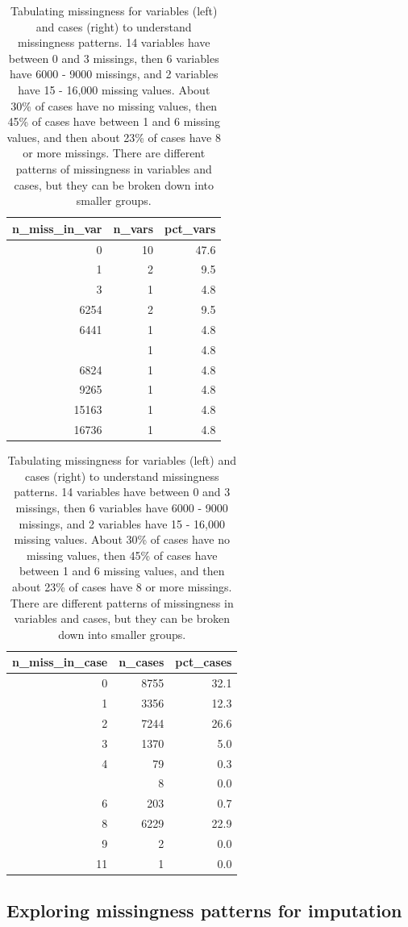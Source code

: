 \documentclass[]{article}
\theoremstyle{definition}
\theoremstyle{definition}
\theoremstyle{definition}
\theoremstyle{remark}
\begin{document}
\begin{table}[!h]
\caption{\label{tab:housing-miss-var-case-table}Tabulating missingness for variables (left) and cases (right) to understand missingness patterns. 14 variables have between 0 and 3 missings, then 6 variables have 6000 - 9000 missings, and 2 variables have 15 - 16,000 missing values. About 30\% of cases have no missing values, then 45\% of cases have between 1 and 6 missing values, and then about 23\% of cases have 8 or more missings. There are different patterns of missingness in variables and cases, but they can be broken down into smaller groups.}

\centering
\begin{tabular}[t]{rrr}
\toprule
n\_miss\_in\_var & n\_vars & pct\_vars\\
\midrule
0 & 10 & 47.6\\
1 & 2 & 9.5\\
3 & 1 & 4.8\\
6254 & 2 & 9.5\\
6441 & 1 & 4.8\\
\addlinespace
6447 & 1 & 4.8\\
6824 & 1 & 4.8\\
9265 & 1 & 4.8\\
15163 & 1 & 4.8\\
16736 & 1 & 4.8\\
\bottomrule
\end{tabular}
\centering
\begin{tabular}[t]{rrr}
\toprule
n\_miss\_in\_case & n\_cases & pct\_cases\\
\midrule
0 & 8755 & 32.1\\
1 & 3356 & 12.3\\
2 & 7244 & 26.6\\
3 & 1370 & 5.0\\
4 & 79 & 0.3\\
\addlinespace
5 & 8 & 0.0\\
6 & 203 & 0.7\\
8 & 6229 & 22.9\\
9 & 2 & 0.0\\
11 & 1 & 0.0\\
\bottomrule
\end{tabular}
\end{table}

\hypertarget{case-study-explore-for-imp}{%
\subsection{Exploring missingness patterns for
imputation}\label{case-study-explore-for-imp}}
\end{document}
